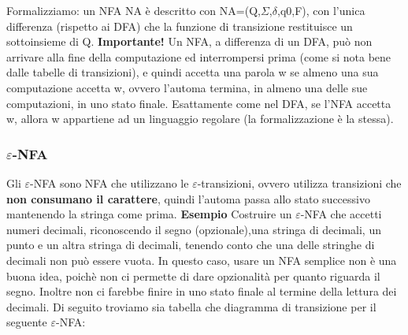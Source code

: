 \documentclass[]{article}
\begin{document}
			Formalizziamo: un NFA NA è descritto con NA=(Q,$\Sigma$,$\delta$,q0,F), con l'unica differenza (rispetto ai DFA) che la funzione di transizione restituisce un sottoinsieme di Q. \newline
			\textbf{Importante!} Un NFA, a differenza di un DFA, può non arrivare alla fine della computazione ed interrompersi prima (come si nota bene dalle tabelle di transizioni), e quindi accetta una parola w se almeno una sua computazione accetta w, ovvero l'automa termina, in almeno una delle sue computazioni, in uno stato finale. Esattamente come nel DFA, se l'NFA accetta w, allora w appartiene ad un linguaggio regolare (la formalizzazione è la stessa).
			\subsubsection{$\varepsilon$-NFA}
				Gli $\varepsilon$-NFA sono NFA che utilizzano le $\varepsilon$-transizioni, ovvero utilizza transizioni che \textbf{non consumano il carattere}, quindi l'automa passa allo stato successivo mantenendo la stringa come prima. \newline
				\textbf{Esempio} Costruire un $\varepsilon$-NFA che accetti numeri decimali, riconoscendo il segno (opzionale),una stringa di decimali, un punto e un altra stringa di decimali, tenendo conto che una delle stringhe di decimali non può essere vuota. \newline
				In questo caso, usare un NFA semplice non è una buona idea, poichè non ci permette di dare opzionalità per quanto riguarda il segno. Inoltre non ci farebbe finire in uno stato finale al termine della lettura dei decimali. Di seguito troviamo sia tabella che diagramma di transizione per il seguente $\varepsilon$-NFA:\newline
\end{document}
